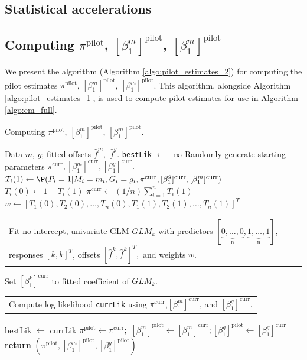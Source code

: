 \documentclass[11pt]{article}
\makeatletter
\newcommand{\multiline}[1]{%
	\begin{tabularx}{\dimexpr\linewidth-\ALG@thistlm}[t]{@{}X@{}}
		#1
	\end{tabularx}
}
\makeatother
\begin{document}
\begin{appendices}
\begin{refsection}
\section{Statistical accelerations}\label{sec:statistical_accelerations}

\subsection*{Computing $\pi^\textrm{pilot}$, $[\beta^m_1]^\textrm{pilot}$, $[\beta^m_1]^\textrm{pilot}$}

We present the algorithm (Algorithm \ref{algo:pilot_estimates_2}) for computing the pilot estimates $\pi^\textrm{pilot}$, $[\beta^m_1]^\textrm{pilot}$, $[\beta^m_1]^\textrm{pilot}$. This algorithm, alongside Algorithm \ref{algo:pilot_estimates_1}, is used to compute pilot estimates for use in Algorithm \ref{algo:em_full}.

\begin{algorithm}
	\caption{Computing $\pi^\textrm{pilot}$, $[\beta^m_1]^\textrm{pilot}$, $[\beta^m_1]^\textrm{pilot}$.}\label{algo:pilot_estimates_2}
	\begin{algorithmic}[2]
		\Require Data $m$, $g$; fitted offsets $\hat{f}^m,$ $\hat{f}^g$.
		\State \texttt{bestLik} $\gets -\infty$ 
		\State Randomly generate starting parameters $\pi^\textrm{curr}, [\beta_1^m]^\textrm{curr}, [\beta^g_1]^\textrm{curr}.$
		 
		\State $T_i(1) \gets \P(P_i = 1 | M_i = m_i, G_i = g_i, \pi^\textrm{curr}, [\beta^g_1]^\textrm{curr}, [\beta_1^m]^\textrm{curr})$
		\State $T_i(0) \gets 1 - T_i(1)$
		\EndFor
		\State $\pi^{\textrm{curr}} \gets (1/n) \sum_{i=1}^n T_i(1)$ 
		\State $w \gets [T_1(0), T_2(0), \dots, T_n(0), T_1(1), T_2(1), \dots, T_n(1)]^T$
		\State \multiline{Fit no-intercept, univariate GLM $GLM_k$ with predictors $[\underbrace{0, \dots, 0}_\textrm{n}, \underbrace{1, \dots, 1}_\textrm{n}]$, responses $[k,k]^T$, offsets $[\hat{f}^k, \hat{f}^k]^T,$ and weights $w$.}
		\State Set $[\beta^k_1]^\textrm{curr}$ to fitted coefficient of $GLM_k$.
		\EndFor
		\State \multiline{
			Compute log likelihood \texttt{currLik} using $\pi^\textrm{curr}$,$ [\beta^m_1]^\textrm{curr}$, and $[\beta^g_1]^\textrm{curr}.$}
		\EndWhile
		\State bestLik $\gets$ currLik
		\State $\pi^\textrm{pilot} \gets \pi^\textrm{curr};$ $[\beta^m_1]^\textrm{pilot} \gets [\beta^m_1]^\textrm{curr}; [\beta^g_1]^\textrm{pilot} \gets [\beta^g_1]^\textrm{curr}$
		\EndIf
		\EndFor
		\State \textbf{return} $(\pi^\textrm{pilot}, [\beta^m_1]^\textrm{pilot}, [\beta^g_1]^\textrm{pilot})$
	\end{algorithmic}
\end{algorithm}


\end{refsection}
\end{appendices}
\end{document}
